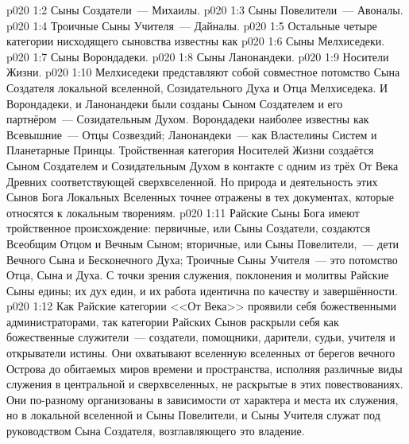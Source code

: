 \vs p020 1:2 Сыны Создатели~--- Михаилы.
\vs p020 1:3 Сыны Повелители~--- Авоналы.
\vs p020 1:4 Троичные Сыны Учителя~--- Дайналы.
\vs p020 1:5 \pc Остальные четыре категории нисходящего сыновства известны как 
\vs p020 1:6 Сыны Мелхиседеки.
\vs p020 1:7 Сыны Ворондадеки.
\vs p020 1:8 Сыны Ланонандеки.
\vs p020 1:9 Носители Жизни.
\vs p020 1:10 \pc Мелхиседеки представляют собой совместное потомство Сына Создателя локальной вселенной, Созидательного Духа и Отца Мелхиседека. И Ворондадеки, и Ланонандеки были созданы Сыном Создателем и его партнёром~--- Созидательным Духом. Ворондадеки наиболее известны как Всевышние~--- Отцы Созвездий; Ланонандеки~--- как Властелины Систем и Планетарные Принцы. Тройственная категория Носителей Жизни создаётся Сыном Создателем и Созидательным Духом в контакте с одним из трёх От Века Древних соответствующей сверхвселенной. Но природа и деятельность этих Сынов Бога Локальных Вселенных точнее отражены в тех документах, которые относятся к локальным творениям.
\vs p020 1:11 \pc Райские Сыны Бога имеют тройственное происхождение: первичные, или Сыны Создатели, создаются Всеобщим Отцом и Вечным Сыном; вторичные, или Сыны Повелители,~--- дети Вечного Сына и Бесконечного Духа; Троичные Сыны Учителя~--- это потомство Отца, Сына и Духа. С точки зрения служения, поклонения и молитвы Райские Сыны едины; их дух един, и их работа идентична по качеству и завершённости.
\vs p020 1:12 Как Райские категории <<От Века>> проявили себя божественными администраторами, так категории Райских Сынов раскрыли себя как божественные служители~--- создатели, помощники, дарители, судьи, учителя и открыватели истины. Они охватывают вселенную вселенных от берегов вечного Острова до обитаемых миров времени и пространства, исполняя различные виды служения в центральной и сверхвселенных, не раскрытые в этих повествованиях. Они по\hyp{}разному организованы в зависимости от характера и места их служения, но в локальной вселенной и Сыны Повелители, и Сыны Учителя служат под руководством Сына Создателя, возглавляющего это владение.
